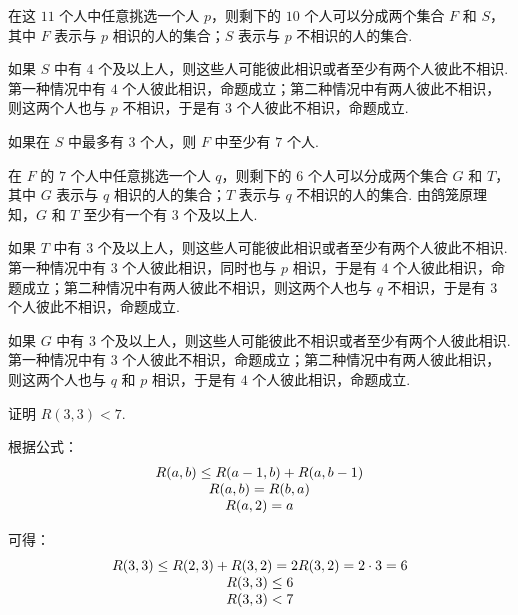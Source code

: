 \documentclass[cn, hazy, blue, normal, 12pt]{elegantnote}
\begin{document}
\begin{solution}[print=true]

    在这 $11$ 个人中任意挑选一个人 $p$，则剩下的 $10$ 个人可以分成两个集合 $F$ 和 $S$，其中 $F$ 表示与 $p$ 相识的人的集合；$S$ 表示与 $p$ 不相识的人的集合.

    如果 $S$ 中有 $4$ 个及以上人，则这些人可能彼此相识或者至少有两个人彼此不相识. 第一种情况中有 $4$ 个人彼此相识，命题成立；第二种情况中有两人彼此不相识，则这两个人也与 $p$ 不相识，于是有 $3$ 个人彼此不相识，命题成立.

    如果在 $S$ 中最多有 $3$ 个人，则 $F$ 中至少有 $7$ 个人.

    在 $F$ 的 $7$ 个人中任意挑选一个人 $q$，则剩下的 $6$ 个人可以分成两个集合 $G$ 和 $T$，其中 $G$ 表示与 $q$ 相识的人的集合；$T$ 表示与 $q$ 不相识的人的集合. 由鸽笼原理知，$G$ 和 $T$ 至少有一个有 $3$ 个及以上人.

    如果 $T$ 中有 $3$ 个及以上人，则这些人可能彼此相识或者至少有两个人彼此不相识. 第一种情况中有 $3$ 个人彼此相识，同时也与 $p$ 相识，于是有 $4$ 个人彼此相识，命题成立；第二种情况中有两人彼此不相识，则这两个人也与 $q$ 不相识，于是有 $3$ 个人彼此不相识，命题成立.

    如果 $G$ 中有 $3$ 个及以上人，则这些人可能彼此不相识或者至少有两个人彼此相识. 第一种情况中有 $3$ 个人彼此不相识，命题成立；第二种情况中有两人彼此相识，则这两个人也与 $q$ 和 $p$ 相识，于是有 $4$ 个人彼此相识，命题成立.

\end{solution}

\begin{exercise}

    证明 $R(3, 3) < 7$.

\end{exercise}

\begin{solution}[print=true]

    根据公式：
    \begin{equation}
        \notag
        \begin{array}{c}
            R(a, b) \leq R(a-1, b)+R(a, b-1) \\
            R(a, b) = R(b, a)                \\
            R(a, 2) = a
        \end{array}
    \end{equation}

    可得：
    \begin{equation}
        \notag
        \begin{array}{c}
            R(3, 3) \leq R(2, 3) + R(3, 2) = 2 R(3, 2) = 2 \cdot 3 = 6 \\
            R(3, 3) \leq 6                                             \\
            R(3, 3) < 7
        \end{array}
    \end{equation}

\end{solution}
\end{document}
